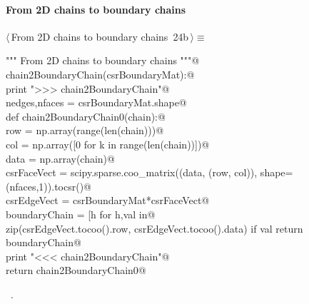 \documentclass[11pt,oneside]{article}    %
\begin{document}
\paragraph{From 2D chains to boundary chains}
\begin{flushleft} \small \label{scrap38}
\protect{}$\langle\,$From 2D chains to boundary chains\nobreak\ {\footnotesize 24b}$\,\rangle\equiv$
\vspace{-1ex}
\begin{list}{}{} \item
\mbox{}\verb@""" From 2D chains to boundary chains """@\\
\mbox{}\verb@def chain2BoundaryChain(csrBoundaryMat):@\\
\mbox{}\verb@    print ">>> chain2BoundaryChain"@\\
\mbox{}\verb@    nedges,nfaces = csrBoundaryMat.shape@\\
\mbox{}\verb@    def chain2BoundaryChain0(chain):@\\
\mbox{}\verb@        row = np.array(range(len(chain)))@\\
\mbox{}\verb@        col = np.array([0 for k in range(len(chain))])@\\
\mbox{}\verb@        data = np.array(chain)@\\
\mbox{}\verb@        csrFaceVect = scipy.sparse.coo_matrix((data, (row, col)), shape=(nfaces,1)).tocsr()@\\
\mbox{}\verb@        csrEdgeVect = csrBoundaryMat*csrFaceVect@\\
\mbox{}\verb@        boundaryChain = [h for h,val in@\\
\mbox{}\verb@            zip(csrEdgeVect.tocoo().row, csrEdgeVect.tocoo().data) if val%2 != 0]@\\
\mbox{}\verb@        return boundaryChain@\\
\mbox{}\verb@    print "<<< chain2BoundaryChain"@\\
\mbox{}\verb@    return chain2BoundaryChain0@\\
\mbox{}\verb@@{\NWsep}
\end{list}
\vspace{-1ex}
\footnotesize\addtolength{\baselineskip}{-1ex}
\begin{list}{}{\setlength{\itemsep}{-\parsep}\setlength{\itemindent}{-\leftmargin}}
\item \NWtxtMacroRefIn\ .
\end{list}
\end{flushleft}
\end{document}
